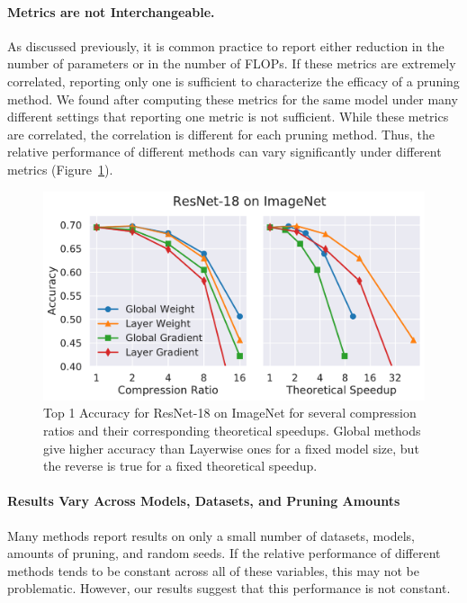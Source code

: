 \paragraph{Metrics are not Interchangeable.}
As discussed previously, it is common practice to report either reduction in the number of parameters or in the number of FLOPs. If these metrics are extremely correlated, reporting only one is sufficient to characterize the efficacy of a pruning method. We found after computing these metrics for the same model under many different settings that reporting one metric is not sufficient. While these metrics are correlated, the correlation is different for each pruning method. Thus, the relative performance of different methods can vary significantly under different metrics (Figure~\ref{fig:ImageNet_flops}).
\begin{figure}[h]
\begin{center}
\includegraphics[width=\linewidth]{shrinkbench/ImageNet_flops}
\caption{Top 1 Accuracy for ResNet-18 on ImageNet for several compression ratios and their corresponding theoretical speedups.
%
Global methods give higher accuracy than Layerwise ones for a fixed model size, but the reverse is true for a fixed theoretical speedup.
}
\label{fig:ImageNet_flops}
\end{center}
\vspace*{-3mm}
\end{figure}

\vspace{-3mm}
\paragraph{Results Vary Across Models, Datasets, and Pruning Amounts}

Many methods report results on only a small number of datasets, models, amounts of pruning, and random seeds. If the relative performance of different methods tends to be constant across all of these variables, this may not be problematic. However, our results suggest that this performance is not constant.

